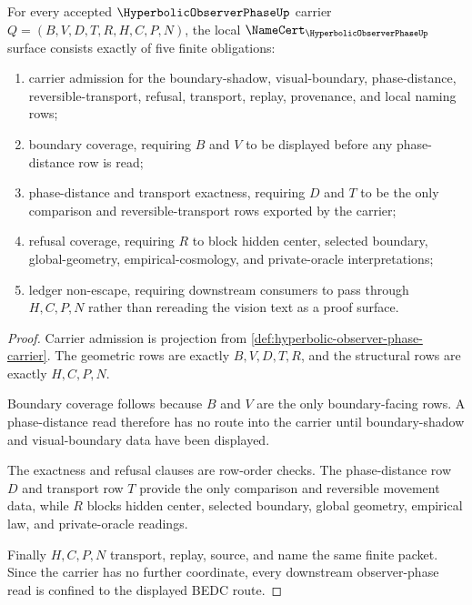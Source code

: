 \begin{theorem}\label{thm:hyperbolic-observer-phase-namecert-obligations}
For every accepted $\HyperbolicObserverPhaseUp$ carrier $Q=(B,V,D,T,R,H,C,P,N)$, the local $\NameCert_{\HyperbolicObserverPhaseUp}$ surface consists exactly of five finite obligations:
\begin{enumerate}
\item carrier admission for the boundary-shadow, visual-boundary, phase-distance, reversible-transport, refusal, transport, replay, provenance, and local naming rows;
\item boundary coverage, requiring $B$ and $V$ to be displayed before any phase-distance row is read;
\item phase-distance and transport exactness, requiring $D$ and $T$ to be the only comparison and reversible-transport rows exported by the carrier;
\item refusal coverage, requiring $R$ to block hidden center, selected boundary, global-geometry, empirical-cosmology, and private-oracle interpretations;
\item ledger non-escape, requiring downstream consumers to pass through $H,C,P,N$ rather than rereading the vision text as a proof surface.
\end{enumerate}
\end{theorem}
\begin{proof}
Carrier admission is projection from \autoref{def:hyperbolic-observer-phase-carrier}. The geometric rows are exactly $B,V,D,T,R$, and the structural rows are exactly $H,C,P,N$.

Boundary coverage follows because $B$ and $V$ are the only boundary-facing rows. A phase-distance read therefore has no route into the carrier until boundary-shadow and visual-boundary data have been displayed.

The exactness and refusal clauses are row-order checks. The phase-distance row $D$ and transport row $T$ provide the only comparison and reversible movement data, while $R$ blocks hidden center, selected boundary, global geometry, empirical law, and private-oracle readings.

Finally $H,C,P,N$ transport, replay, source, and name the same finite packet. Since the carrier has no further coordinate, every downstream observer-phase read is confined to the displayed BEDC route.
\end{proof}

